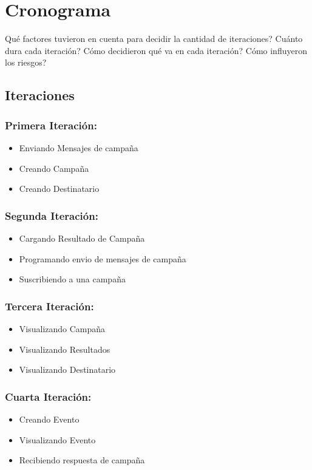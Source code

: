 \documentclass[a4paper, 11pt]{article}
\begin{document}
\section{Cronograma}
Qué factores tuvieron en cuenta para decidir la cantidad de iteraciones?
Cuánto dura cada iteración?
Cómo decidieron qué va en cada iteración?
Cómo influyeron los riesgos?

\subsection{Iteraciones}
\subsubsection{Primera Iteraci\'on:}
\begin{itemize}
\item Enviando Mensajes de campaña
\item Creando Campaña
\item Creando Destinatario
\end{itemize}

\subsubsection{Segunda Iteraci\'on:}
\begin{itemize}
\item Cargando Resultado de Campaña
\item Programando envio de mensajes de campaña
\item Suscribiendo a una campaña
\end{itemize}


\subsubsection{Tercera Iteraci\'on:}
\begin{itemize}
\item Visualizando Campaña
\item Visualizando Resultados
\item Visualizando Destinatario
\end{itemize}


\subsubsection{Cuarta Iteraci\'on:}
\begin{itemize}
\item Creando Evento
\item Visualizando Evento
\item Recibiendo respuesta de campaña
\end{itemize}
\end{document}
